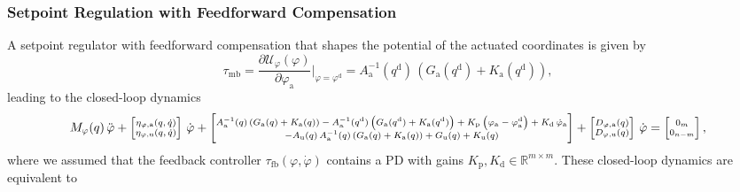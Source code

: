 \subsubsection{Setpoint Regulation with Feedforward Compensation}
A setpoint regulator with feedforward compensation that shapes the potential of the actuated coordinates is given by~\citep{pustina2025analysis}
\begin{equation}\label{eq:background:underactuated_potential_shaping}
    \tau_\mathrm{mb} = \frac{\partial \mathcal{U}_\varphi(\varphi)}{\partial \varphi_\mathrm{a}} \bigg |_{\varphi=\varphi^\mathrm{d}} = A_\mathrm{a}^{-1}(q^\mathrm{d}) \, \left ( G_\mathrm{a}(q^\mathrm{d}) + K_\mathrm{a}(q^\mathrm{d}) \right ),
\end{equation}
leading to the closed-loop dynamics
\begin{equation}\scriptsize
    M_\varphi(q) \, \ddot{\varphi} + \begin{bmatrix}
        \eta_{\varphi,\mathrm{a}}(q,\dot{q})\\ \eta_{\varphi,\mathrm{u}}(q,\dot{q})
    \end{bmatrix} \, \dot{\varphi} + \begin{bmatrix}
        A_\mathrm{a}^{-1}(q) \left ( G_\mathrm{a}(q) + K_\mathrm{a}(q) \right ) - A_\mathrm{a}^{-1}(q^\mathrm{d}) \left ( G_\mathrm{a}(q^\mathrm{d}) + K_\mathrm{a}(q^\mathrm{d}) \right ) + K_\mathrm{p} \left ( \varphi_\mathrm{a} - \varphi^\mathrm{d}_\mathrm{a} \right ) + K_\mathrm{d} \, \dot{\varphi}_\mathrm{a}\\
        -A_\mathrm{u}(q) \, A_\mathrm{a}^{-1}(q) \left ( G_\mathrm{a}(q) + K_\mathrm{a}(q) \right ) + G_\mathrm{u}(q) + K_\mathrm{u}(q)
    \end{bmatrix} + \begin{bmatrix}
        D_{\varphi,\mathrm{a}}(q)\\
        D_{\varphi,\mathrm{u}}(q)
    \end{bmatrix} \, \dot{\varphi} = \begin{bmatrix}
        0_m\\ 0_{n-m}
    \end{bmatrix},
\end{equation}
where we assumed that the feedback controller $\tau_\mathrm{fb}(\varphi,\dot{\varphi})$ contains a PD with gains $K_\mathrm{p}, K_\mathrm{d} \in \mathbb{R}^{m \times m}$.
These closed-loop dynamics are equivalent to
